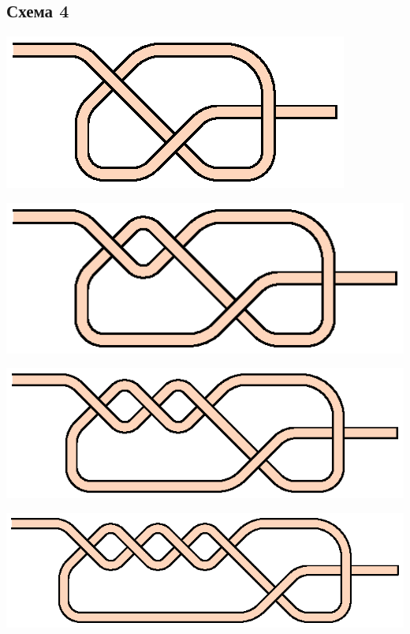 \subsection{Схема 4}
\graphicspath{{\currentpath}}

\includegraphics{images/s-04-a1.eps}

\includegraphics{images/s-04-a2.eps}

\includegraphics{images/s-04-a3.eps}

\includegraphics{images/s-04-a4.eps}